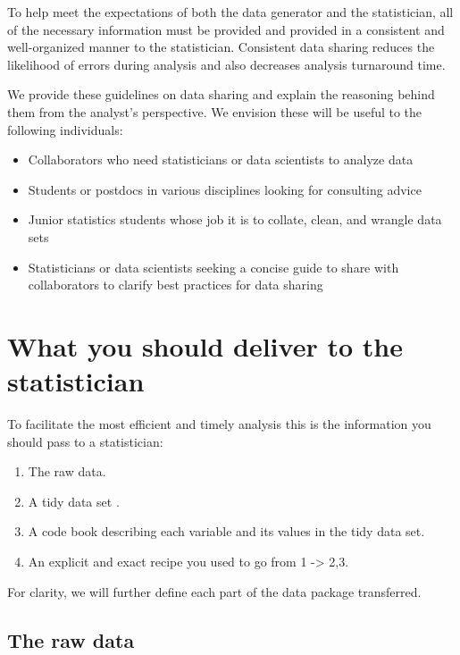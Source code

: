 \documentclass[12pt]{article}
\providecommand{\tightlist}{%
  \setlength{\itemsep}{0pt}\setlength{\parskip}{0pt}}
\begin{document}
To help meet the expectations of both the data generator and the
statistician, all of the necessary information must be provided and
provided in a consistent and well-organized manner to the statistician.
Consistent data sharing reduces the likelihood of errors during analysis
and also decreases analysis turnaround time.

We provide these guidelines on data sharing and explain the reasoning
behind them from the analyst's perspective. We envision these will be
useful to the following individuals:

\begin{itemize}
\tightlist
\item
  Collaborators who need statisticians or data scientists to analyze
  data
\item
  Students or postdocs in various disciplines looking for consulting
  advice
\item
  Junior statistics students whose job it is to collate, clean, and
  wrangle data sets
\item
  Statisticians or data scientists seeking a concise guide to share with
  collaborators to clarify best practices for data sharing
\end{itemize}

\section{What you should deliver to the
statistician}\label{what-you-should-deliver-to-the-statistician}

To facilitate the most efficient and timely analysis this is the
information you should pass to a statistician:

\begin{enumerate}
\def\labelenumi{\arabic{enumi}.}
\tightlist
\item
  The raw data.
\item
  A tidy data set \citep{_tidy_data}.
\item
  A code book describing each variable and its values in the tidy data
  set.
\item
  An explicit and exact recipe you used to go from 1 -\textgreater{}
  2,3.
\end{enumerate}

For clarity, we will further define each part of the data package
transferred.

\subsection{The raw data}\label{the-raw-data}
\end{document}

